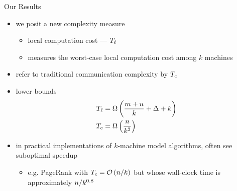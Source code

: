 \begin{frame}{Our Results}
    \begin{itemize}
        \item we posit a new complexity measure
              \begin{itemize}
                  \item \alert{local computation cost} --- $T_{\ell}$
                  \item measures the worst-case local computation cost among $k$ machines
              \end{itemize}
        \item refer to traditional communication complexity by $T_c$
        \item lower bounds
              \begin{align*}
                  T_{\ell} & = \Omega\left(\frac{m + n}{k} + \Delta + k\right) \\
                  T_c & = \Omega\left(\frac{n}{k^2}\right)
              \end{align*}
        \item in practical implementations of $k$-machine model algorithms,
              often see suboptimal speedup
              \begin{itemize}
                  \item e.g. PageRank with $T_c = \mathcal{O}\left(n / k\right)$ but whose wall-clock
                        time is approximately $n / k^{0.8}$
              \end{itemize}
    \end{itemize}
\end{frame}

